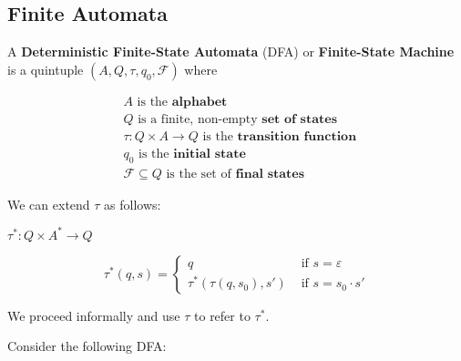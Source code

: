 \subsection{Finite Automata}\label{subsubsec:finite-automata}

\begin{definition}
A \textbf{Deterministic Finite-State Automata} (DFA) or \textbf{Finite-State Machine} is a quintuple \((A, Q, \tau, q_0, \mathcal{F})\) where 

\begin{align*}
    &A\text{ is the }\textbf{alphabet}\\
    &Q\text{ is a finite, non-empty }\textbf{set of states}\\
    &\tau:Q\times A\to Q\text{ is the }\textbf{transition function }\\
    &q_0\text{ is the }\textbf{initial state}\\
    &\mathcal{F}\subseteq Q\text{ is the set of }\textbf{final states}
\end{align*}
\end{definition}
We can extend \(\tau \) as follows: 

\(\tau^*:Q\times A^*\to Q\)

\[\tau^*(q, s) = \begin{cases} q &\mbox{ if } s=\varepsilon \\
                             \tau^*(\tau(q, s_0), s') &\mbox{ if } s=s_0\cdot s'\end{cases}\]

We proceed informally and use \(\tau \) to refer to \(\tau^*\). 

Consider the following DFA\@:

\begin{center}
\end{center}

